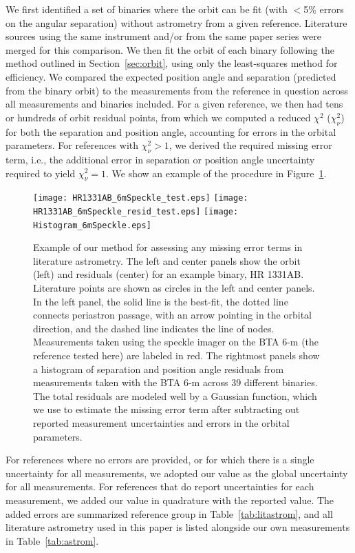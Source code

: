 \documentclass[twocolumn]{aastex62}
\begin{document}
We first identified a set of binaries where the orbit can be fit (with $<$5\% errors on the angular separation) without astrometry from a given reference. Literature sources using the same instrument and/or from the same paper series were merged for this comparison. We then fit the orbit of each binary following the method outlined in Section~\ref{sec:orbit}, using only the least-squares method for efficiency. We compared the expected position angle and separation (predicted from the binary orbit) to the measurements from the reference in question across all measurements and binaries included. For a given reference, we then had tens or hundreds of orbit residual points, from which we computed a reduced $\chi^2$ ($\chi^2_\nu$) for both the separation and position angle, accounting for errors in the orbital parameters. For references with $\chi^2_\nu > 1$, we derived the required missing error term, i.e., the additional error in separation or position angle uncertainty required to yield $\chi^2_\nu = 1$. We show an example of the procedure in Figure~\ref{fig:literr}. 


\begin{figure}[ht]
\begin{center}
\texttt{[image: HR1331AB\_6mSpeckle\_test.eps]}
\texttt{[image: HR1331AB\_6mSpeckle\_resid\_test.eps]}
\texttt{[image: Histogram\_6mSpeckle.eps]}
\caption{Example of our method for assessing any missing error terms in literature astrometry. The left and center panels show the orbit (left) and residuals (center) for an example binary, HR 1331AB. Literature points are shown as circles in the left and center panels. In the left panel, the solid line is the best-fit, the dotted line connects periastron passage, with an arrow pointing in the orbital direction, and the dashed line indicates the line of nodes. Measurements taken using the speckle imager on the BTA 6-m (the reference tested here) are labeled in red. The rightmost panels show a histogram of separation and position angle residuals from measurements taken with the BTA 6-m across 39 different binaries. The total residuals are modeled well by a Gaussian function, which we use to estimate the missing error term after subtracting out reported measurement uncertainties and errors in the orbital parameters. }
\label{fig:literr}
\end{center}
\end{figure}

For references where no errors are provided, or for which there is a single uncertainty for all measurements, we adopted our value as the global uncertainty for all measurements. For references that do report uncertainties for each measurement, we added our value in quadrature with the reported value. The added errors are summarized reference group in Table~\ref{tab:litastrom}, and all literature astrometry used in this paper is listed alongside our own measurements in Table~\ref{tab:astrom}. 
\end{document}

